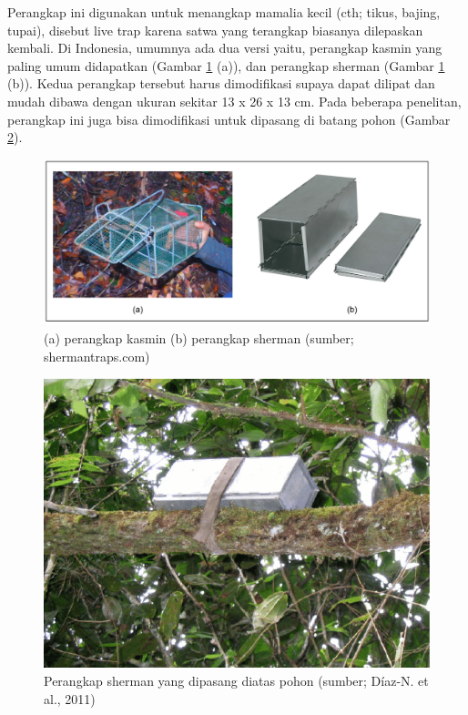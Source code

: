 \documentclass[
  oneside]{book}
\begin{document}
Perangkap ini digunakan untuk menangkap mamalia kecil (cth; tikus, bajing, tupai), disebut live trap karena satwa yang terangkap biasanya dilepaskan kembali. Di Indonesia, umumnya ada dua versi yaitu, perangkap kasmin yang paling umum didapatkan (Gambar \ref{fig:lvtrap} (a)), dan perangkap sherman (Gambar \ref{fig:lvtrap} (b)). Kedua perangkap tersebut harus dimodifikasi supaya dapat dilipat dan mudah dibawa dengan ukuran sekitar 13 x 26 x 13 cm. Pada beberapa penelitan, perangkap ini juga bisa dimodifikasi untuk dipasang di batang pohon (Gambar \ref{fig:stot}).

\begin{figure}

{\centering \includegraphics[width=1\linewidth]{images/livetrap} 

}

\caption{(a) perangkap kasmin (b) perangkap sherman (sumber; shermantraps.com)}\label{fig:lvtrap}
\end{figure}

\begin{figure}

{\centering \includegraphics[width=1\linewidth]{images/stontrees} 

}

\caption{Perangkap sherman yang dipasang diatas pohon (sumber; Díaz-N. et al., 2011)}\label{fig:stot}
\end{figure}
\end{document}
